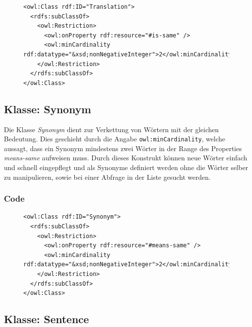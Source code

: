 \documentclass[draft,
    11pt,
    latin1,
    a4paper,
    oneside
]{scrreprt}
\let\oldemph=\emph
\renewcommand{\emph}[1]{\index{#1}\oldemph{#1}}
\begin{document}
\begin{figure}[H]
 \lstset{language=XML}
 \begin{lstlisting}[label=owl:translation,caption={Die Klasse \emph{Translation} beinhaltet alle \"Ubersetzungen eines Wortes}]
<owl:Class rdf:ID="Translation">
  <rdfs:subClassOf>
    <owl:Restriction>
      <owl:onProperty rdf:resource="#is-same" />
      <owl:minCardinality rdf:datatype="&xsd;nonNegativeInteger">2</owl:minCardinality>
    </owl:Restriction>
  </rdfs:subClassOf>
</owl:Class>
 \end{lstlisting}
\end{figure}

\subsection{Klasse: Synonym} \label{sec:class_synonym}

Die Klasse \emph{Synonym} dient zur Verkettung von W\"ortern mit der gleichen Bedeutung. Dies geschieht durch die Angabe \texttt{owl:minCardinality}, welche aussagt, dass ein Synonym mindestens zwei W\"orter in der Range des Properties \emph{means-same} aufweisen muss. Durch dieses Konstrukt k\"onnen neue W\"orter einfach und schnell eingepflegt und als Synonyme definiert werden ohne die W\"orter selber zu manipulieren, sowie bei einer Abfrage in der Liste gesucht werden.

\subsubsection{Code}  \label{sec:class_synonym_code}

\begin{figure}[H]
 \lstset{language=XML}
 \begin{lstlisting}[label=owl:synonym,caption={Die Klasse \emph{Synonym} beinhaltet alle W\"orter dir etwas \"ahnliches bedeuten}]
<owl:Class rdf:ID="Synonym">
  <rdfs:subClassOf>
    <owl:Restriction>
      <owl:onProperty rdf:resource="#means-same" />
      <owl:minCardinality rdf:datatype="&xsd;nonNegativeInteger">2</owl:minCardinality>
    </owl:Restriction>
  </rdfs:subClassOf>
</owl:Class>
 \end{lstlisting}
\end{figure}

\subsection{Klasse: Sentence} \label{sec:class_sentence}
\end{document}
